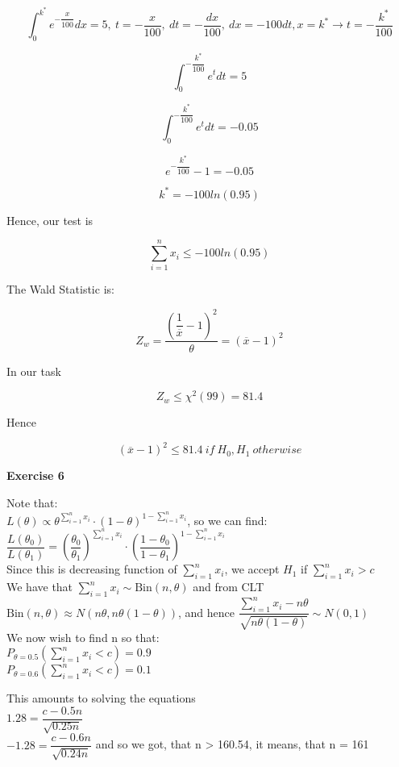 \documentclass[12pt]{article}
\begin{document}
\begin{list}{()~}{}
\[\int_0^{k^*}e^{-\dfrac{x}{100}}dx=5,\ t=-\dfrac{x}{100},\ dt=-\dfrac{dx}{100},\ dx=-100dt, x=k^* \rightarrow t=-\dfrac{k^*}{100} \]

\[\int _0^{-\dfrac{k^*}{100}}e^t dt=5\]

\[\int _0^{-\dfrac{k^*}{100}}e^t dt =-0.05\]

\[e^{-\dfrac{k^*}{100}}-1=-0.05\]

\[k^*=-100ln\left(0.95\right)\]

Hence, our test is

\[\sum_{i=1}^n x_i \leq -100ln\left(0.95\right)\]

\item
The Wald Statistic is:

\[Z_w=\dfrac{\left(\dfrac{1}{\overline{x}}-1\right)^2}{\theta} = \left({\overline{x}}-1\right)^2\]

In our task 

\[Z_w\leq \chi^2\left(99\right)=81.4\]

Hence

\[\left({\overline{x}}-1\right)^2\leq 81.4\ if\ H_0, H_1\ otherwise\]

\end{list}

\medskip

\textbf{Exercise 6}

Note that:\\

$L(\theta) \propto \theta^{\sum^n_{i = 1} x_i} \cdot \left( 1 - \theta \right)^{1 - \sum^n_{i = 1} x_i}$, so we can find:\\
$\dfrac{L(\theta_0)}{L(\theta_1)} = \left( \dfrac{\theta_0}{\theta_1} \right)^{\sum^n_{i = 1} x_i} \cdot \left( \dfrac{1- \theta_0}{ 1 - \theta_1} \right)^{1 - \sum^n_{i = 1} x_i}$ \\
Since this is decreasing function of $\sum^n_{i = 1} x_i$, we accept $H_1$ if $\sum^n_{i = 1} x_i > c$\\
We have that $\sum^n_{i = 1} x_i \sim \mathrm{Bin}(n, \theta)$ and from CLT $\mathrm{Bin}(n,\theta) \approx N( n\theta, n\theta (1 - \theta) )$, and hence  $\dfrac{\sum^n_{i = 1} x_i - n\theta}{\sqrt{n \theta (1 - \theta)}} \sim N(0,1)$\\
We now wish to find n so that:\\
$P_{\theta = 0.5} \left( \sum^n_{i = 1} x_i < c \right) = 0.9$\\
$P_{\theta = 0.6} \left( \sum^n_{i = 1} x_i < c \right) = 0.1$

This amounts to solving the equations\\
$1.28 = \dfrac{c - 0.5n}{\sqrt{0.25n}}$\\
$-1.28 = \dfrac{c - 0.6n}{\sqrt{0.24n}}$ and so we got, that n > 160.54, it means, that n = 161
\end{document}
